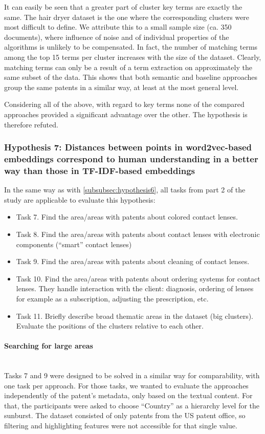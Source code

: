 It can easily be seen that a greater part of cluster key terms are exactly the same.
The hair dryer dataset is the one where the corresponding clusters were most difficult to define.
We attribute this to a small sample size (ca. 350 documents), where influence of noise and of individual properties of the algorithms is unlikely to be compensated.
In fact, the number of matching terms among the top 15 terms per cluster increases with the size of the dataset.
Clearly, matching terms can only be a result of a term extraction on approximately the same subset of the data.
This shows that both semantic and baseline approaches group the same patents in a similar way, at least at the most general level.

Considering all of the above, with regard to key terms none of the compared approaches provided a significant advantage over the other.
The hypothesis is therefore refuted.

\subsubsection{Hypothesis 7: Distances between points in word2vec-based embeddings correspond to human understanding in a better way than those in TF-IDF-based embeddings}
\label{subsubsec:hypothesis7}

In the same way as with \autoref{subsubsec:hypothesis6}, all tasks from part 2 of the study are applicable to evaluate this hypothesis:
\begin{itemize}
\item Task 7. Find the area/areas with patents about colored contact lenses.
\item Task 8. Find the area/areas with patents about contact lenses with electronic components (“smart” contact lenses)
\item Task 9. Find the area/areas with patents about cleaning of contact lenses.
\item Task 10. Find the area/areas with patents about ordering systems for contact lenses. They handle interaction with the client: diagnosis, ordering of lenses for example as a subscription, adjusting the prescription, etc.
\item Task 11. Briefly describe broad thematic areas in the dataset (big clusters). Evaluate the positions of the clusters relative to each other.
\end{itemize}

\paragraph{Searching for large areas}~\\
Tasks 7 and 9 were designed to be solved in a similar way for comparability, with one task per approach.
For those tasks, we wanted to evaluate the approaches independently of the patent's metadata, only based on the textual content.
For that, the participants were asked to choose ``Country'' as a hierarchy level for the sunburst.
The dataset consisted of only patents from the US patent office, so filtering and highlighting features were not accessible for that single value.

